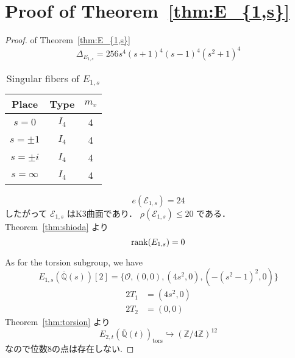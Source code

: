 \documentclass[main]{subfiles}
\begin{document}
\chapter{Proof of Theorem~\ref{thm:E_{1,s}}}

\begin{proof}{of Theorem~\ref{thm:E_{1,s}}}
    \begin{equation}
        \Delta_{E_{1,s}} = 256s^{4} (s + 1)^{4} (s - 1)^{4} (s^{2} + 1)^{4}
    \end{equation}

    \begin{table}[h]
        \centering
        \caption{Singular fibers of $E_{1,s}$}
        \begin{tabular}{|c|c|c|}
            \hline
            Place      & Type  & $m_v$ \\
            \hline
            $s=0$      & $I_4$ & 4     \\
            $s=\pm 1$  & $I_4$ & 4     \\
            $s=\pm i$  & $I_4$ & 4     \\
            $s=\infty$ & $I_4$ & 4     \\
            \hline
        \end{tabular}
    \end{table}

    \begin{equation}
        e(\mathcal{E}_{1,s}) = 24
    \end{equation}
    したがって $\mathcal{E}_{1,s}$ はK3曲面であり． $\rho(\mathcal{E}_{1,s}) \leq 20$ である．
    Theorem~\ref{thm:shioda} より
    \begin{equation}
        \operatorname{rank}(E_{1,s}) = 0
    \end{equation}

    As for the torsion subgroup, we have
    \begin{equation}
        E_{1,s}(\overline{\mathbb{Q}}(s))[2] = \{\mathcal{O}, (0,0), (4s^{2},0),( - (s^{2} - 1)^{2},0)\}
    \end{equation}
    \begin{align}
        2T_1 & = (4s^2,0) \\
        2T_2 & = (0,0)
    \end{align}
    Theorem~\ref{thm:torsion} より
    \begin{equation}
        E_{2,t}(\overline{\mathbb{Q}}(t))_ \text{tors} \hookrightarrow (\mathbb{Z} / 4 \mathbb{Z})^{12}
    \end{equation}
    なので位数8の点は存在しない.
\end{proof}
\end{document}
